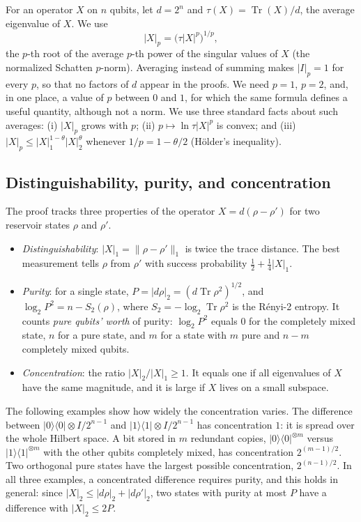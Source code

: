 \documentclass[aps,prl,twocolumn,superscriptaddress,floatfix]{revtex4-2}
\theoremstyle{plain}
\newcommand{\tr}{\operatorname{Tr}}
\newcommand{\ketbra}[2]{|#1\rangle\!\langle #2|}
\newcommand{\nrm}[2]{\lvert #1\rvert_{#2}}
\newcommand{\Norm}[1]{\lVert #1\rVert}
\begin{document}
For an operator $X$ on $n$ qubits, let $d=2^n$ and $\tau(X)=\tr(X)/d$, the average eigenvalue of $X$. We use
\begin{equation}
\nrm Xp=\bigl(\tau|X|^p\bigr)^{1/p},
\label{eq:S-norm}
\end{equation}
the $p$-th root of the average $p$-th power of the singular values of $X$ (the normalized Schatten $p$-norm). Averaging instead of summing makes $\nrm Ip=1$ for every $p$, so that no factors of $d$ appear in the proofs. We need $p=1$, $p=2$, and, in one place, a value of $p$ between $0$ and $1$, for which the same formula defines a useful quantity, although not a norm. We use three standard facts about such averages: (i) $\nrm Xp$ grows with $p$; (ii) $p\mapsto\ln\tau|X|^p$ is convex; and (iii) $\nrm Xp\le\nrm X1^{1-\theta}\nrm X2^{\theta}$ whenever $1/p=1-\theta/2$ (H\"older's inequality).

\subsection{Distinguishability, purity, and concentration}

The proof tracks three properties of the operator $X=d(\rho-\rho')$ for two reservoir states $\rho$ and $\rho'$.
\begin{itemize}
\item \emph{Distinguishability}: $\nrm X1=\Norm{\rho-\rho'}_1$ is twice the trace distance. The best measurement tells $\rho$ from $\rho'$ with success probability $\frac12+\frac14\nrm X1$.
\item \emph{Purity}: for a single state, $P=\nrm{d\rho}2=(d\tr\rho^2)^{1/2}$, and $\log_2P^2=n-S_2(\rho)$, where $S_2=-\log_2\tr\rho^2$ is the R\'enyi-2 entropy. It counts \emph{pure qubits' worth} of purity: $\log_2P^2$ equals $0$ for the completely mixed state, $n$ for a pure state, and $m$ for a state with $m$ pure and $n-m$ completely mixed qubits.
\item \emph{Concentration}: the ratio $\nrm X2/\nrm X1\ge1$. It equals one if all eigenvalues of $X$ have the same magnitude, and it is large if $X$ lives on a small subspace.
\end{itemize}
The following examples show how widely the concentration varies. The difference between $\ketbra00\otimes I/2^{n-1}$ and $\ketbra11\otimes I/2^{n-1}$ has concentration $1$: it is spread over the whole Hilbert space. A bit stored in $m$ redundant copies, $\ketbra00^{\otimes m}$ versus $\ketbra11^{\otimes m}$ with the other qubits completely mixed, has concentration $2^{(m-1)/2}$. Two orthogonal pure states have the largest possible concentration, $2^{(n-1)/2}$. In all three examples, a concentrated difference requires purity, and this holds in general: since $\nrm X2\le\nrm{d\rho}2+\nrm{d\rho'}2$, two states with purity at most $P$ have a difference with $\nrm X2\le2P$.
\end{document}
